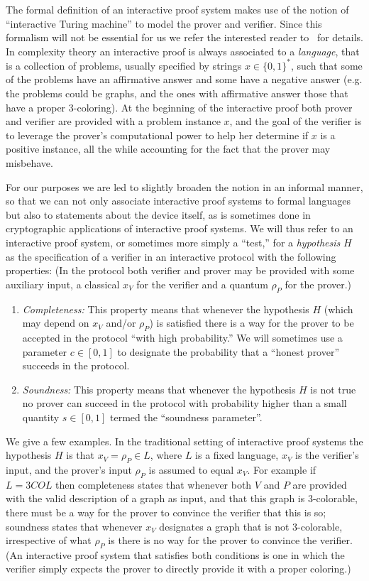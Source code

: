 The formal definition of an interactive proof system makes use of the notion of ``interactive Turing machine'' to model the prover and verifier. Since this formalism will not be essential for us we refer the interested reader to~\cite[Chapter 4]{vidick2016quantum} for details. In complexity theory an interactive proof is always associated to a \emph{language}, that is a collection of problems, usually specified by strings $x\in\{0,1\}^*$, such that some of the problems have an affirmative answer and some have a negative answer (e.g. the problems could be graphs, and the ones with affirmative answer those that have a proper $3$-coloring). At the beginning of the interactive proof both prover and verifier are provided with a problem instance $x$, and the goal of the verifier is to leverage the prover's computational power to help her determine if $x$ is a positive instance, all the while accounting for the fact that the prover may misbehave. 

For our purposes we are led to slightly broaden the notion in an informal manner, so that we can not only associate interactive proof systems to formal languages but also to statements about the device itself, as is sometimes done in cryptographic applications of interactive proof systems. We will thus refer to an interactive proof system, or sometimes more simply a ``test,'' for a \emph{hypothesis} $H$ as the specification of a verifier in an interactive protocol with the following properties: (In the protocol both verifier and prover may be provided with some auxiliary input, a classical $x_V$ for the verifier and a quantum $\rho_P$ for the prover.)
\begin{enumerate}
\item \emph{Completeness:} This property means that whenever the hypothesis $H$ (which may depend on $x_V$ and/or $\rho_P$) is satisfied there is a way for the prover to be accepted in the protocol ``with high probability.'' We will sometimes use a parameter $c\in [0,1]$ to designate the probability that a ``honest prover'' succeeds in the protocol. 
\item \emph{Soundness:} This property means that whenever the hypothesis $H$ is not true no prover can succeed in the protocol with probability higher than a small quantity $s\in[0,1]$ termed the ``soundness parameter''. 
\end{enumerate}
We give a few examples. In the traditional setting of interactive proof systems the hypothesis $H$ is that $x_V = \rho_P \in L$, where $L$ is a fixed language,  $x_V$ is the verifier's input, and the prover's input $\rho_P$ is assumed to equal $x_V$. For example if $L=3COL$ then completeness states that whenever both $V$ and $P$ are provided with the valid description of a graph as input, and that this graph is $3$-colorable, there must be a way for the prover to convince the verifier that this is so; soundness states that whenever $x_V$ designates a graph that is not $3$-colorable, irrespective of what $\rho_P$ is there is no way for the prover to convince the verifier. (An interactive proof system that satisfies both conditions is one in which the verifier simply expects the prover to directly provide it with a proper coloring.)

